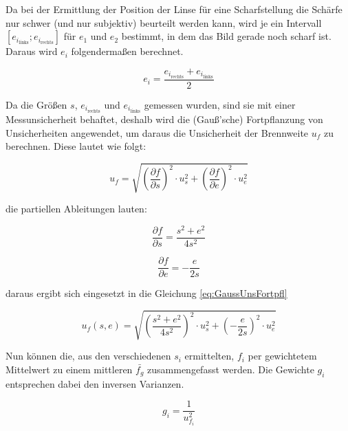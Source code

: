 \documentclass[a4paper,12pt]{article}
\begin{document}
Da bei der Ermittlung der Position der Linse für eine Scharfstellung die Schärfe nur schwer (und nur subjektiv)
beurteilt werden kann, wird je ein Intervall $[e_{i_\mathrm{links}};e_{i_\mathrm{rechts}}]$ für $e_1$ und
$e_2$ bestimmt, in dem das Bild gerade noch scharf ist. Daraus wird $e_i$ folgendermaßen berechnet.

\begin{equation}
    \label{eq:BesselAbstandIntervall}
    e_i = \frac{e_{i_\mathrm{rechts}} + e_{i_\mathrm{links}}}{2}
\end{equation}

Da die Größen $s$, $e_{i_\mathrm{rechts}}$ und $e_{i_\mathrm{links}}$ gemessen wurden, sind sie mit einer
Messunsicherheit behaftet, deshalb wird die (Gauß'sche) Fortpflanzung von Unsicherheiten angewendet,
um daraus die Unsicherheit der Brennweite $u_f$ zu berechnen. Diese lautet wie folgt:

\begin{equation}
    \label{eq:GaussUnsFortpfl}
    u_f = \sqrt{\left(\frac{\partial f}{\partial s}\right)^2 \cdot u_s^2 + \left(\frac{\partial f}{\partial e}\right)^2 \cdot u_e^2}
\end{equation}

die partiellen Ableitungen lauten:

\begin{equation}
    \frac{\partial f}{\partial s} = \frac{s^2+e^2}{4s^2}
\end{equation}

\begin{equation}
    \frac{\partial f}{\partial e} = -\frac{e}{2s}
\end{equation}

daraus ergibt sich eingesetzt in die Gleichung \ref{eq:GaussUnsFortpfl}

\begin{equation}
    \label{eq:BesselBrennwUnsFortpfl}
    u_f(s,e) = \sqrt{\left(\frac{s^2+e^2}{4s^2}\right)^2 \cdot u_s^2 + \left(-\frac{e}{2s}\right)^2 \cdot u_e^2}
\end{equation}

Nun können die, aus den verschiedenen $s_i$ ermittelten, $f_i$ per gewichtetem Mittelwert zu einem
mittleren $\bar{f_g}$ zusammengefasst werden. Die Gewichte $g_i$ entsprechen dabei den inversen
Varianzen.

\begin{equation}
    \label{eq:Gewicht}
    g_i = \frac{1}{u_{f_i}^2}
\end{equation}
\end{document}

